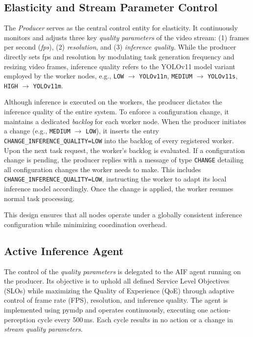 \subsection{Elasticity and Stream Parameter Control}
The \textit{Producer} serves as the central control entity for elasticity. It continuously monitors and adjusts three key \textit{quality parameters} of the video stream: (1) frames per second (\textit{fps}), (2) \textit{resolution}, and (3) \textit{inference quality}. While the producer directly sets fps and resolution by modulating task generation frequency and resizing video frames, inference quality refers to the YOLOv11 model variant employed by the worker nodes, e.g., \texttt{LOW} $\rightarrow$ \texttt{YOLOv11n}, \texttt{MEDIUM} $\rightarrow$ \texttt{YOLOv11s}, \texttt{HIGH} $\rightarrow$ \texttt{YOLOv11m}.

Although inference is executed on the workers, the producer dictates the inference quality of the entire system. To enforce a configuration change, it maintains a dedicated \textit{backlog} for each worker node. When the producer initiates a change (e.g., \texttt{MEDIUM} $\rightarrow$ \texttt{LOW}), it inserts the entry \texttt{CHANGE\_INFERENCE\_QUALITY=LOW} into the backlog of every registered worker. Upon the next task request, the worker's backlog is evaluated. If a configuration change is pending, the producer replies with a message of type \texttt{CHANGE} detailing all configuration changes the worker needs to make. This includes \texttt{CHANGE\_INFERENCE\_QUALITY=LOW}, instructing the worker to adapt its local inference model accordingly. Once the change is applied, the worker resumes normal task processing.

This design ensures that all nodes operate under a globally consistent inference configuration while minimizing coordination overhead.

\subsection{Active Inference Agent}
\label{sec:evaluation-implementation-active-infernce-agemt}
The control of the \textit{quality parameters} is delegated to the AIF agent running on the producer. Its objective is to uphold all defined Service Level Objectives (SLOs) while maximizing the Quality of Experience (QoE) through adaptive control of frame rate (FPS), resolution, and inference quality. The agent is implemented using pymdp \cite{heins_pymdp_2022} and operates continuously, executing one action-perception cycle every 500\,ms. Each cycle results in no action or a change in \textit{stream quality parameters}. 

